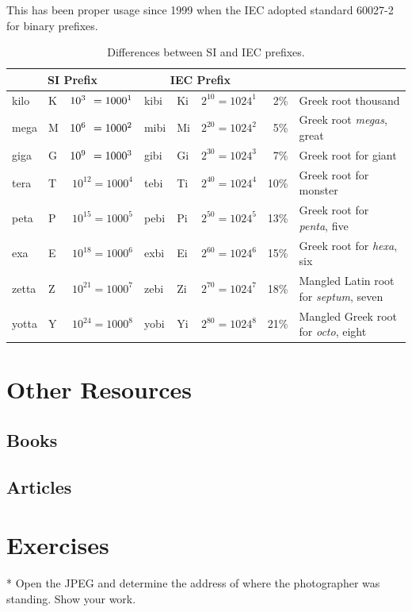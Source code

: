 This has been proper usage
since 1999 when the IEC adopted standard 60027-2 for binary prefixes.



\newcommand{\WZ}{{\color{white}0}}

\begin{table}
\begin{tabular}{||llr|llr|rl|}
\multicolumn{3}{c}{SI Prefix} & \multicolumn{3}{c}{IEC Prefix} \\ 
\hline
kilo  & K & $10^{3\WZ} = 1000^1 $ & kibi & Ki & $2^{10} = 1024^1 $& 2\% & Greek root {thousand} \\
\hline
mega  & M & $10^{6\WZ} = 1000^2 $ & mibi & Mi & $2^{20} = 1024^2 $& 5\% & Greek root \emph{megas}, {great}\\
\hline
giga  & G & $10^{9\WZ} = 1000^3 $ & gibi & Gi & $2^{30} = 1024^3 $& 7\% & Greek root for {giant}\\
\hline
tera  & T & $10^{12} = 1000^4$ & tebi & Ti & $2^{40} = 1024^4 $& 10\% & Greek root for {monster}\\
\hline
peta  & P & $10^{15} = 1000^5$ & pebi & Pi & $2^{50} = 1024^5 $& 13\% & Greek root for \emph{penta}, {five}\\
\hline
exa   & E & $10^{18} = 1000^6$ & exbi & Ei & $2^{60} = 1024^6 $& 15\% & Greek root for \emph{hexa}, {six}\\
\hline
zetta & Z & $10^{21} = 1000^7$ & zebi & Zi & $2^{70} = 1024^7 $& 18\% & Mangled Latin root for \emph{septum}, {seven}\\
\hline
yotta & Y & $10^{24} = 1000^8$ & yobi & Yi & $2^{80} = 1024^8 $& 21\% & Mangled Greek root for \emph{octo}, {eight}\\
\hline
\hline
\end{tabular}
\caption{Differences between SI and IEC prefixes.}\label{si-iec-differences}
\end{table}

\section{Other Resources}
\subsection{Books}
\subsection{Articles}

\section{Exercises}
* Open the JPEG and determine the address of where the photographer
was standing. Show your work.



